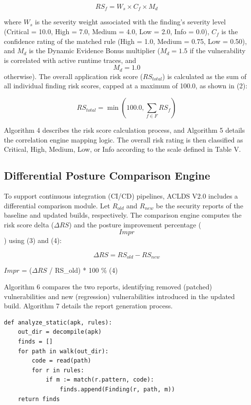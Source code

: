 \documentclass[conference]{
IEEEtran}
\begin{document}
\begin{equation}
RS_f = W_s \times C_f \times M_d
\end{equation}

where $W_s$ is the severity weight associated with the finding's severity level (Critical = 10.0, High = 7.0, Medium = 4.0, Low = 2.0, Info = 0.0), $C_f$ is the confidence rating of the matched rule (High = 1.0, Medium = 0.75, Low = 0.50), and $M_d$ is the Dynamic Evidence Bonus multiplier ($M_d = 1.5$ if the vulnerability is correlated with active runtime traces, and $$M_d = 1.0$$ otherwise). The overall application risk score ($RS_{total}$) is calculated as the sum of all individual finding risk scores, capped at a maximum of 100.0, as shown in (2):

\begin{equation}
RS_{total} = \min\left(100.0, \sum_{f \in F} RS_f\right)
\end{equation}

Algorithm 4 describes the risk score calculation process, and Algorithm 5 details the correlation engine mapping logic. The overall risk rating is then classified as Critical, High, Medium, Low, or Info according to the scale defined in Table V.

\subsection{Differential Posture Comparison Engine}
To support continuous integration (CI/CD) pipelines, ACLDS V2.0 includes a differential comparison module. Let $R_{old}$ and $R_{new}$ be the security reports of the baseline and updated builds, respectively. The comparison engine computes the risk score delta ($\Delta RS$) and the posture improvement percentage ($$Impr$$) using (3) and (4):

\begin{equation}
\Delta RS = RS_{old} - RS_{new}
\end{equation}

$Impr$ = ($\Delta RS$ / RS_old) * 100 \% (4)

Algorithm 6 compares the two reports, identifying removed (patched) vulnerabilities and new (regression) vulnerabilities introduced in the updated build. Algorithm 7 details the report generation process.

\begin{lstlisting}[caption={Algorithm 1: Static Bytecode Analysis}, basicstyle=\scriptsize\ttfamily]
def analyze_static(apk, rules):
    out_dir = decompile(apk)
    finds = []
    for path in walk(out_dir):
        code = read(path)
        for r in rules:
            if m := match(r.pattern, code):
                finds.append(Finding(r, path, m))
    return finds
\end{lstlisting}
\end{document}
